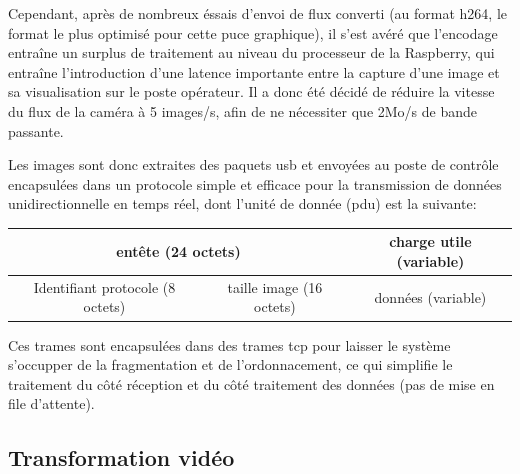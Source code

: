 			Cependant, après de nombreux éssais d'envoi de flux converti (au format h264, le format le plus optimisé pour cette puce graphique), il s'est avéré que l'encodage entraîne un surplus de traitement au niveau du processeur de la Raspberry, qui entraîne l'introduction d'une latence importante entre la capture d'une image et sa visualisation sur le poste opérateur.
			Il a donc été décidé de réduire la vitesse du flux de la caméra à 5 images/s, afin de ne nécessiter que 2Mo/s de bande passante.
			\par
			Les images sont donc extraites des paquets \gls{usb} et envoyées au poste de contrôle encapsulées dans un protocole simple et efficace pour la transmission de données unidirectionnelle en temps réel, dont l'unité de donnée (\gls{pdu}) est la suivante:

			\begin{center}
				\scriptsize
				\begin{tabular}[h]{|c|c||c|}
					\toprule
					\multicolumn{2}{|c||}{entête (24 octets)} & charge utile (variable) \\
					\midrule
					Identifiant protocole (8 octets) & taille image (16 octets) & données (variable)\\
					\bottomrule
				\end{tabular}
			\end{center}

			Ces trames sont encapsulées dans des trames \gls{tcp} pour laisser le système s'occupper de la fragmentation et de l'ordonnacement, ce qui simplifie le traitement du côté réception et du côté traitement des données (pas de mise en file d'attente).
			
		\subsection{Transformation vidéo}
		\label{sub:transfo}
		
